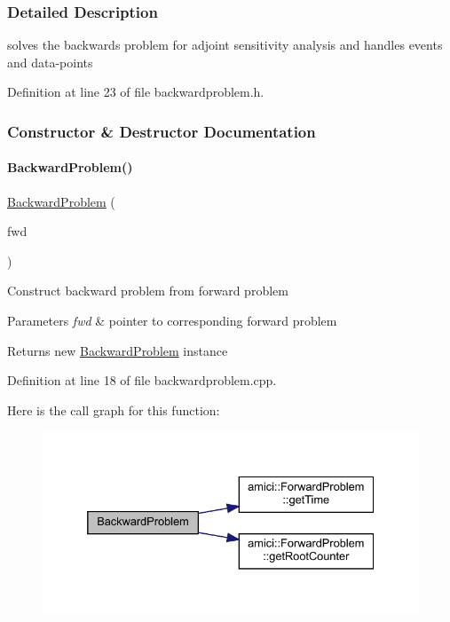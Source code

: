 \subsubsection{Detailed Description}
solves the backwards problem for adjoint sensitivity analysis and handles events and data-\/points 

Definition at line 23 of file backwardproblem.\+h.



\subsubsection{Constructor \& Destructor Documentation}
\mbox{\label{classamici_1_1_backward_problem_a173995c3ce3a4c59d815dfbeebb8dc6e}} 
\paragraph{\texorpdfstring{Backward\+Problem()}{BackwardProblem()}}
{\footnotesize\ttfamily \mbox{\hyperlink{classamici_1_1_backward_problem}{Backward\+Problem}} (\begin{DoxyParamCaption}\item[{const \mbox{\hyperlink{classamici_1_1_forward_problem}{Forward\+Problem}} $\ast$}]{fwd }\end{DoxyParamCaption})}

Construct backward problem from forward problem 
\begin{DoxyParams}{Parameters}
{\em fwd} & pointer to corresponding forward problem \\
\hline
\end{DoxyParams}
\begin{DoxyReturn}{Returns}
new \mbox{\hyperlink{classamici_1_1_backward_problem}{Backward\+Problem}} instance 
\end{DoxyReturn}


Definition at line 18 of file backwardproblem.\+cpp.

Here is the call graph for this function\+:
\nopagebreak
\begin{figure}[H]
\begin{center}
\leavevmode
\includegraphics[width=332pt]{classamici_1_1_backward_problem_a173995c3ce3a4c59d815dfbeebb8dc6e_cgraph}
\end{center}
\end{figure}


